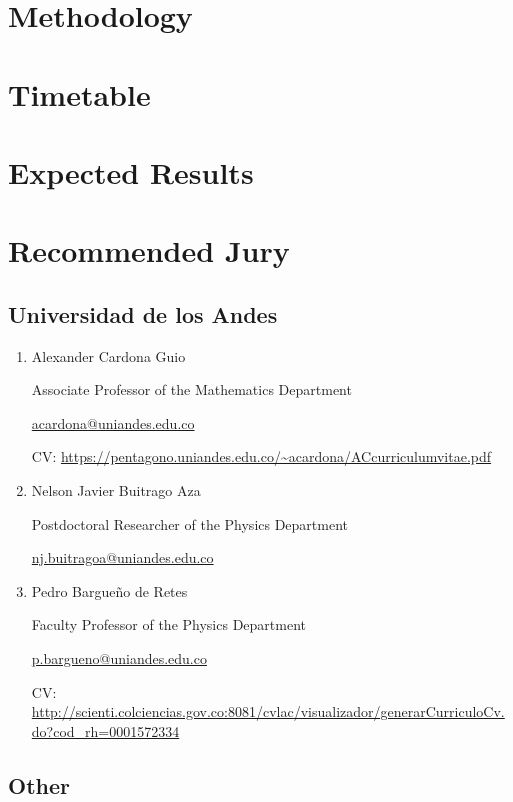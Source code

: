 \documentclass{article}
\begin{document}
\section{Methodology}

\section{Timetable}

\section{Expected Results}

\section*{Recommended Jury}

\subsection*{Universidad de los Andes}

\begin{enumerate}

\item Alexander Cardona Guio

Associate Professor of the Mathematics Department

\href{mailto:acardona@uniandes.edu.co}{acardona@uniandes.edu.co}

CV: \url{https://pentagono.uniandes.edu.co/~acardona/ACcurriculumvitae.pdf}

\item Nelson Javier Buitrago Aza

Postdoctoral Researcher of the Physics Department

\href{mailto:nj.buitragoa@uniandes.edu.co}{nj.buitragoa@uniandes.edu.co}

\item Pedro Bargueño de Retes

Faculty Professor of the Physics Department

\href{mailto:p.bargueno@uniandes.edu.co}{p.bargueno@uniandes.edu.co}

CV: \url{http://scienti.colciencias.gov.co:8081/cvlac/visualizador/generarCurriculoCv.do?cod_rh=0001572334}

\end{enumerate}

\subsection*{Other}
\end{document}
